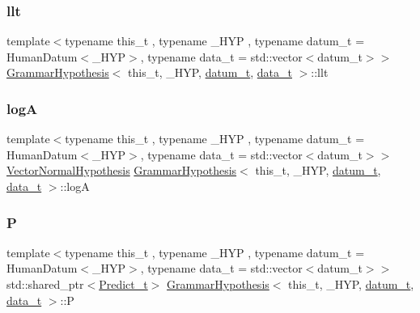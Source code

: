 \mbox{\label{class_grammar_hypothesis_a0c8f321de22c6e78d95b0e265f346892}} 
\subsubsection{\texorpdfstring{llt}{llt}}
{\footnotesize\ttfamily template$<$typename this\+\_\+t , typename \+\_\+\+H\+YP , typename datum\+\_\+t  = Human\+Datum$<$\+\_\+\+H\+Y\+P$>$, typename data\+\_\+t  = std\+::vector$<$datum\+\_\+t$>$$>$ \\
\hyperlink{class_grammar_hypothesis}{Grammar\+Hypothesis}$<$ this\+\_\+t, \+\_\+\+H\+YP, \hyperlink{class_bayesable_a9f1a6c0cd7855550fa10b1a8f13a5867}{datum\+\_\+t}, \hyperlink{class_bayesable_aa2788c4d7718c0a824e1d28c4c98f921}{data\+\_\+t} $>$\+::llt}

\mbox{\label{class_grammar_hypothesis_a8b6e2526b457a656511dda7eb4b9e546}} 
\subsubsection{\texorpdfstring{logA}{logA}}
{\footnotesize\ttfamily template$<$typename this\+\_\+t , typename \+\_\+\+H\+YP , typename datum\+\_\+t  = Human\+Datum$<$\+\_\+\+H\+Y\+P$>$, typename data\+\_\+t  = std\+::vector$<$datum\+\_\+t$>$$>$ \\
\hyperlink{class_vector_normal_hypothesis}{Vector\+Normal\+Hypothesis} \hyperlink{class_grammar_hypothesis}{Grammar\+Hypothesis}$<$ this\+\_\+t, \+\_\+\+H\+YP, \hyperlink{class_bayesable_a9f1a6c0cd7855550fa10b1a8f13a5867}{datum\+\_\+t}, \hyperlink{class_bayesable_aa2788c4d7718c0a824e1d28c4c98f921}{data\+\_\+t} $>$\+::logA}

\mbox{\label{class_grammar_hypothesis_a9b3df606fce3805c6cd1ba2dd542a73c}} 
\subsubsection{\texorpdfstring{P}{P}}
{\footnotesize\ttfamily template$<$typename this\+\_\+t , typename \+\_\+\+H\+YP , typename datum\+\_\+t  = Human\+Datum$<$\+\_\+\+H\+Y\+P$>$, typename data\+\_\+t  = std\+::vector$<$datum\+\_\+t$>$$>$ \\
std\+::shared\+\_\+ptr$<$\hyperlink{class_grammar_hypothesis_aa5ecc4d2215fa50a9c2b4e7c682c7cd7}{Predict\+\_\+t}$>$ \hyperlink{class_grammar_hypothesis}{Grammar\+Hypothesis}$<$ this\+\_\+t, \+\_\+\+H\+YP, \hyperlink{class_bayesable_a9f1a6c0cd7855550fa10b1a8f13a5867}{datum\+\_\+t}, \hyperlink{class_bayesable_aa2788c4d7718c0a824e1d28c4c98f921}{data\+\_\+t} $>$\+::P}

